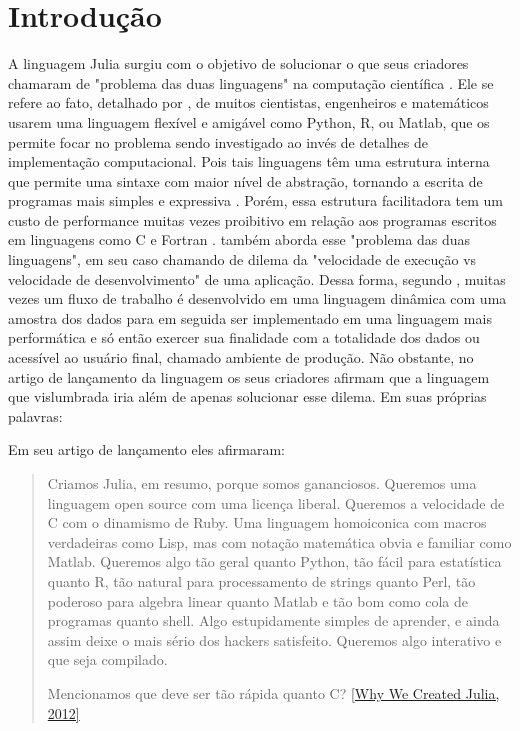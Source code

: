 % 



\chapter{ Introdu\c{c}\~{a}o}


A linguagem Julia surgiu com o objetivo de solucionar o que seus criadores chamaram de "problema das duas linguagens" na computação científica \cite{Bezanson2012}. Ele se refere ao fato, detalhado por \cite{Balbaert2016}, de muitos cientistas, engenheiros e matemáticos usarem uma linguagem flexível e amigável como Python, R, ou Matlab, que os permite focar no problema sendo investigado ao invés de detalhes de implementação computacional. Pois tais linguagens têm uma estrutura interna que permite uma sintaxe com maior nível de abstração, tornando a escrita de programas mais simples e expressiva \cite{Fangohr2004}. Porém, essa estrutura facilitadora tem um custo de performance muitas vezes proibitivo em relação aos programas escritos em linguagens como C e Fortran \cite{Nanz2015}. \cite{Klok2021} também aborda esse "problema das duas linguagens", em seu caso chamando de dilema da "velocidade de execução vs velocidade de desenvolvimento" de uma aplicação. 
Dessa forma, segundo \cite{Balbaert2016}, muitas vezes um fluxo de trabalho é desenvolvido em uma linguagem dinâmica com uma amostra dos dados para em seguida ser implementado em uma linguagem mais performática e só então exercer sua finalidade com a totalidade dos dados ou acessível ao usuário final, chamado ambiente de produção. 
Não obstante, no artigo de lançamento da linguagem os seus criadores afirmam que a linguagem que vislumbrada iria além de apenas solucionar esse dilema. Em suas próprias palavras: 

Em seu artigo de lançamento eles afirmaram: 

\begin{quote}
   Criamos Julia, em resumo, porque somos gananciosos. 
   Queremos uma linguagem open source com uma licença liberal. Queremos a velocidade de C com o dinamismo de Ruby. Uma linguagem homoiconica com macros verdadeiras como Lisp, mas com notação matemática obvia e familiar como Matlab. Queremos algo tão geral quanto Python, tão fácil para estatística quanto R, tão natural para processamento de strings quanto Perl, tão poderoso para algebra linear quanto Matlab e tão bom como cola de programas quanto shell. Algo estupidamente simples de aprender, e ainda assim deixe o mais sério dos hackers satisfeito. Queremos algo interativo e que seja compilado. 
   
   Mencionamos que deve ser tão rápida quanto C? 
   \href{https://julialang.org/blog/2012/02/why-we-created-julia/}{[Why We Created Julia, 2012]}  \cite{Bezanson2012a}
   
   
\end{quote}


